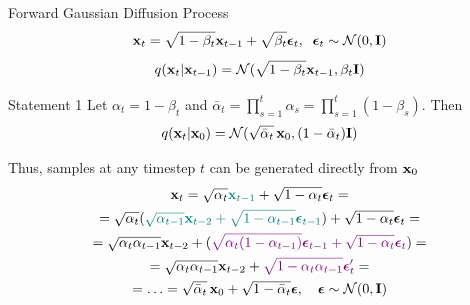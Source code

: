 \documentclass{beamer}
\renewcommand{\eqpause}{}
\renewcommand{\nextonslide}[1]{#1}
\begin{document}
\begin{frame}{Forward Gaussian Diffusion Process}
	\[
		\mathbf{x}_t = \sqrt{1 - \beta_t} \mathbf{x}_{t-1} + \sqrt{\beta_t} \boldsymbol{\epsilon}_t, \;\; \boldsymbol{\epsilon}_t \sim \mathcal{N}(0, \mathbf{I})
	\]
	\[
		q(\mathbf{x}_t | \mathbf{x}_{t-1}) = \mathcal{N}(\sqrt{1 - \beta_t} \mathbf{x}_{t-1}, \beta_t \mathbf{I})
	\]
    \eqpause
	\vspace{-0.5cm}
	\begin{block}{Statement 1}
		Let $\alpha_t = 1 - \beta_t$ and $\bar{\alpha}_t = \prod_{s=1}^t \alpha_s = \prod_{s=1}^t (1 - \beta_s)$. Then
		\[
			q(\mathbf{x}_t | \mathbf{x}_0) = \mathcal{N}(\sqrt{\bar{\alpha}_t} \,\mathbf{x}_0, (1 - \bar{\alpha}_t) \mathbf{I})
		\]
        \eqpause
		Thus, samples at any timestep $t$ can be generated directly from $\mathbf{x}_0$
		\vspace{-0.2cm}
		{\small
		\begin{multline*}
			\bx_t = \sqrt{\alpha_t} {\color{teal}\bx_{t-1}} + \sqrt{1 - \alpha_t} \bepsilon_t
			\nextonslide{ = \\ = \sqrt{\alpha_t} ( {\color{teal} \sqrt{\alpha_{t-1}} \bx_{t-2} + \sqrt{1 - \alpha_{t-1}} \bepsilon_{t-1} } ) + \sqrt{1 - \alpha_t} \bepsilon_t}
			\nextonslide{ = \\ = \sqrt{\alpha_t \alpha_{t-1}} \bx_{t-2} + ( {\color{violet} \sqrt{\alpha_t (1-\alpha_{t-1})} \bepsilon_{t-1} + \sqrt{1-\alpha_t} \bepsilon_t } )}
			\nextonslide{ = \\ = \sqrt{\alpha_t \alpha_{t-1}} \bx_{t-2} + {\color{violet} \sqrt{1-\alpha_t \alpha_{t-1}} \bepsilon'_t}}
			\nextonslide{= \\ = \ldots = \sqrt{\bar{\alpha}_t}\, \bx_0 + \sqrt{1-\bar{\alpha}_t} \bepsilon, \quad \bepsilon \sim \cN(0, \bI)}
		\end{multline*}
		}
	\end{block}
 \end{frame}
\end{document}
